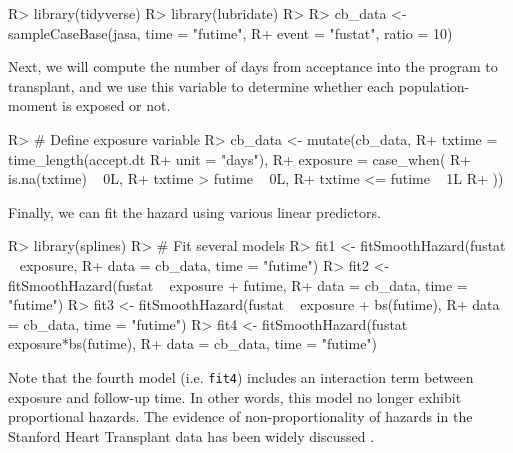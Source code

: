 \documentclass[
]{jss}
\begin{document}
\begin{CodeChunk}

\begin{CodeInput}
R> library(tidyverse)
R> library(lubridate)
R> 
R> cb_data <- sampleCaseBase(jasa, time = "futime", 
R+                           event = "fustat", ratio = 10)
\end{CodeInput}
\end{CodeChunk}

Next, we will compute the number of days from acceptance into the
program to transplant, and we use this variable to determine whether
each population-moment is exposed or not.

\begin{CodeChunk}

\begin{CodeInput}
R> # Define exposure variable
R> cb_data <- mutate(cb_data,
R+                   txtime = time_length(accept.dt %
R+                                        unit = "days"),
R+                   exposure = case_when(
R+                     is.na(txtime) ~ 0L,
R+                     txtime > futime ~ 0L,
R+                     txtime <= futime ~ 1L
R+                   ))
\end{CodeInput}
\end{CodeChunk}

Finally, we can fit the hazard using various linear predictors.

\begin{CodeChunk}

\begin{CodeInput}
R> library(splines)
R> # Fit several models
R> fit1 <- fitSmoothHazard(fustat ~ exposure,
R+                         data = cb_data, time = "futime")
R> fit2 <- fitSmoothHazard(fustat ~ exposure + futime,
R+                         data = cb_data, time = "futime")
R> fit3 <- fitSmoothHazard(fustat ~ exposure + bs(futime),
R+                         data = cb_data, time = "futime")
R> fit4 <- fitSmoothHazard(fustat ~ exposure*bs(futime),
R+                         data = cb_data, time = "futime")
\end{CodeInput}
\end{CodeChunk}

Note that the fourth model (i.e. \texttt{fit4}) includes an interaction
term between exposure and follow-up time. In other words, this model no
longer exhibit proportional hazards. The evidence of non-proportionality
of hazards in the Stanford Heart Transplant data has been widely
discussed \citep{arjas1988graphical}.
\end{document}
